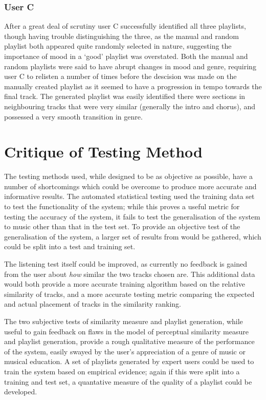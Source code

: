 \subsubsection{User C}
\label{text:testing:user:blind:c}
After a great deal of scrutiny user C successfully identified all three playlists, though having trouble distinguishing the three, as the manual and random playlist both appeared quite randomly selected in nature, suggesting the importance of mood in a `good' playlist was overstated. Both the manual and random playlists were said to have abrupt changes in mood and genre, requiring user C to relisten a number of times before the descision was made on the manually created playlist as it seemed to have a progression in tempo towards the final track. The generated playlist was easily identified there were sections in neighbouring tracks that were very similar (generally the intro and chorus), and possessed a very smooth transition in genre.
\section{Critique of Testing Method}
The testing methods used, while designed to be as objective as possible, have a number of shortcomings which could be overcome to produce more accurate and informative results. The automated statistical testing used the training data set to test the functionality of the system; while this proves a useful metric for testing the accuracy of the system, it fails to test the generalisation of the system to music other than that in the test set. To provide an objective test of the generalisation of the system, a larger set of results from  would be gathered, which could be split into a test and training set.

The listening test itself could be improved, as currently no feedback is gained from the user about \emph{how} similar the two tracks chosen are. This additional data would both provide a more accurate training algorithm based on the relative similarity of tracks, and a more accurate testing metric comparing the expected and actual placement of tracks in the similarity ranking.

The two subjective tests of similarity measure and playlist generation, while useful to gain feedback on flaws in the model of perceptual similarity measure and playlist generation, provide a rough qualitative measure of the performance of the system, easily swayed by the user's appreciation of a genre of music or musical education. A set of playlists generated by expert users could be used to train the system based on empirical evidence; again if this were split into a training and test set, a quantative measure of the quality of a playlist could be developed.

